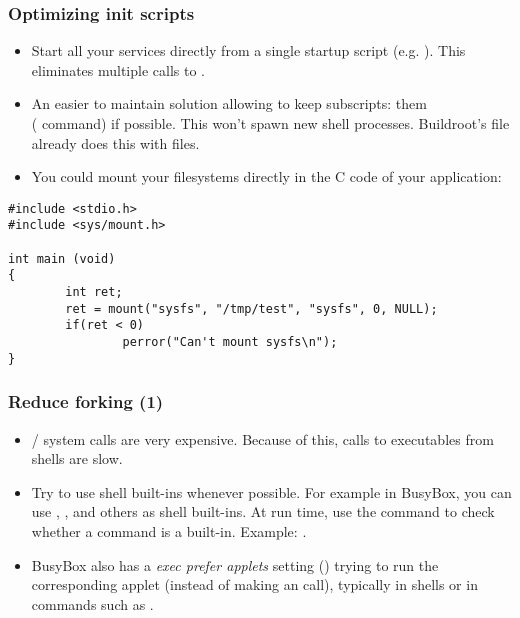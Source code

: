 \begin{frame}[fragile]
\frametitle{Optimizing init scripts}
\begin{itemize}
        \item Start all your services directly from a single startup
              script (e.g. ). This eliminates multiple
              calls to .
        \item An easier to maintain solution allowing to keep subscripts:  them\\
              ( command) if possible. This won't spawn new shell
              processes. Buildroot's  file already
              does this with  files.
        \item You could mount your filesystems directly in the C code
              of your application:
\end{itemize}
\begin{block}{}
\begin{verbatim}
#include <stdio.h>
#include <sys/mount.h>

int main (void)
{
        int ret;
        ret = mount("sysfs", "/tmp/test", "sysfs", 0, NULL);
        if(ret < 0)
                perror("Can't mount sysfs\n");
}
\end{verbatim}
\end{block}
\end{frame}

\begin{frame}[fragile]
\frametitle{Reduce forking (1)}
\begin{itemize}
\item {}/ system calls are very expensive.
      Because of this, calls to executables from shells are slow.
\item Try to use shell built-ins whenever possible. For example in
      BusyBox, you can use , , 
      and others as shell built-ins. At run time, use the 
      command to check whether a command is a built-in. Example:
      .
\item BusyBox also has a {\em exec prefer applets} setting
      () trying to run the corresponding
      applet (instead of making an  call), typically in shells
      or in commands such as .
\end{itemize}
\end{frame}

